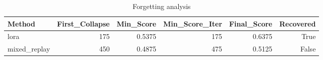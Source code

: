 \begin{table}[htbp]
\centering
\caption{Forgetting analysis}
\label{tab:forgetting}
\begin{tabular}{lrrrrr}
\toprule
\textbf{Method} & \textbf{First\_Collapse} & \textbf{Min\_Score} & \textbf{Min\_Score\_Iter} & \textbf{Final\_Score} & \textbf{Recovered} \\
\midrule
lora & 175 & 0.5375 & 175 & 0.6375 & True \\
mixed\_replay & 450 & 0.4875 & 475 & 0.5125 & False \\
\bottomrule
\end{tabular}
\end{table}